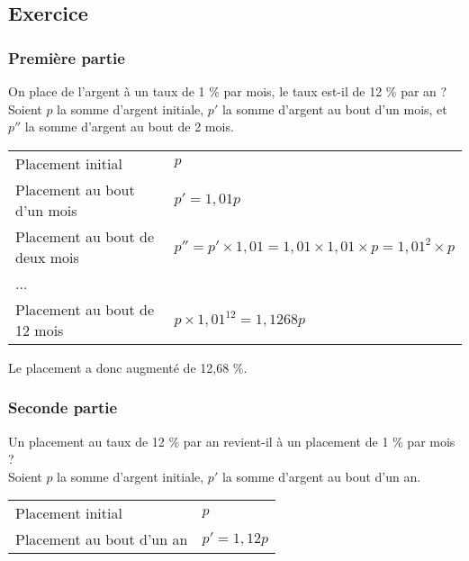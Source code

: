 \newpage

\subsection{Exercice }

\subsubsection*{Première partie}

On place de l'argent à un taux de 1 \% par mois, le taux est-il de 12 \% par an ? \\

Soient $p$ la somme d'argent initiale, $p'$ la somme d'argent au bout d'un mois, et $p''$ la somme d'argent au bout de 2 mois. \\

\begin{tabular}{ll}
Placement initial & $p$ \\
Placement au bout d'un mois & $p' = 1,01p$ \\
Placement au bout de deux mois & $p'' = p' \times 1,01 = 1,01 \times 1,01 \times p = 1,01^2 \times p $ \\
... & \\
Placement au bout de 12 mois & $ p \times 1,01^{12} = 1,1268p $ \\
\end{tabular}

\vspace{.3cm}

Le placement a donc augmenté de 12,68 \%.

\subsubsection*{Seconde partie}

Un placement au taux de 12 \% par an revient-il à un placement de 1 \% par mois ? \\

Soient $p$ la somme d'argent initiale, $p'$ la somme d'argent au bout d'un an. \\

\begin{tabular}{ll}
Placement initial & $p$ \\
Placement au bout d'un an & $p' = 1,12p$ \\
\end{tabular}

\vspace{.3cm}

